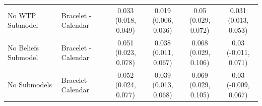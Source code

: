 {\begin{tabular}[t]{llcccc}
No WTP Submodel & Bracelet - Calendar & \makecell[c]{0.033\\(0.018, 0.049)} & \makecell[c]{0.019\\(0.006, 0.036)} & \makecell[c]{0.05\\(0.029, 0.072)} & \makecell[c]{0.031\\(0.013, 0.053)}\\
No Beliefs Submodel & Bracelet - Calendar & \makecell[c]{0.051\\(0.023, 0.078)} & \makecell[c]{0.038\\(0.011, 0.067)} & \makecell[c]{0.068\\(0.029, 0.106)} & \makecell[c]{0.03\\(-0.011, 0.071)}\\
No Submodels & Bracelet - Calendar & \makecell[c]{0.052\\(0.024, 0.077)} & \makecell[c]{0.039\\(0.013, 0.068)} & \makecell[c]{0.069\\(0.029, 0.105)} & \makecell[c]{0.03\\(-0.009, 0.067)}\\
\bottomrule
\end{tabular}}

